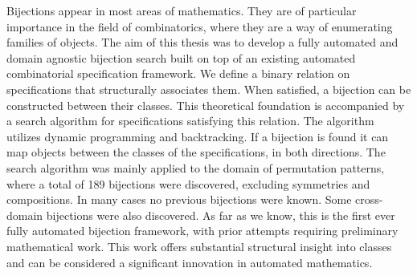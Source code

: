 Bijections appear in most areas of mathematics. They are of particular importance in the field of combinatorics, where they are a way of enumerating families of objects. The aim of this thesis was to develop a fully automated and domain agnostic bijection search built on top of an existing automated combinatorial specification framework. We define a binary relation on specifications that structurally associates them. When satisfied, a bijection can be constructed between their classes. This theoretical foundation is accompanied by a search algorithm for specifications satisfying this relation. The algorithm utilizes dynamic programming and backtracking. If a bijection is found it can map objects between the classes of the specifications, in both directions. The search algorithm was mainly applied to the domain of permutation patterns, where a total of 189 bijections were discovered, excluding symmetries and compositions. In many cases no previous bijections were known. Some cross-domain bijections were also discovered. As far as we know, this is the first ever fully automated bijection framework, with prior attempts requiring preliminary mathematical work. This work offers substantial structural insight into classes and can be considered a significant innovation in automated mathematics.



